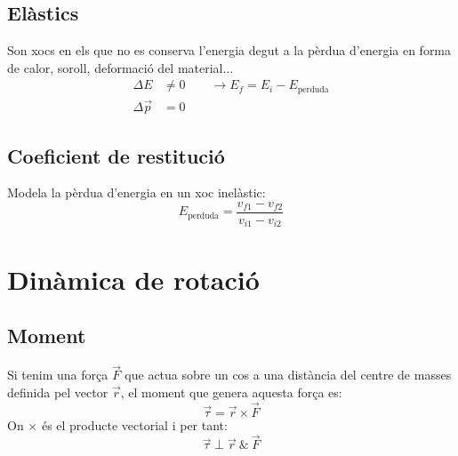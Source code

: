 \subsection{Elàstics}
Son xocs en els que no es conserva l'energia degut a la pèrdua d'energia en forma de calor, soroll, deformació del material...
\begin{align}
    \Delta E &\neq 0 \qquad \rightarrow E_f = E_i - E_\text{perduda}\\
    \Delta \vec{p} &= 0
\end{align}

\subsection{Coeficient de restitució}
Modela la pèrdua d'energia en un xoc inelàstic:
\begin{equation}
    E_\text{perduda} = \frac{v_{f1}-v_{f2}}{v_{i1}-v_{i2}}
\end{equation}

\section{Dinàmica de rotació}
\subsection{Moment}
Si tenim una força $\vec{F}$ que actua sobre un cos a una distància del centre de masses definida pel vector $\vec{r}$, el moment que genera aquesta força es:
\begin{equation}
    \vec{\tau} = \vec{r} \times \vec{F}
\end{equation}
On $\times$ és el producte vectorial i per tant:
\begin{equation}
    \vec{\tau} \perp \vec{r}\ \&\ \vec{F}
\end{equation}

\begin{center}
\end{center}


